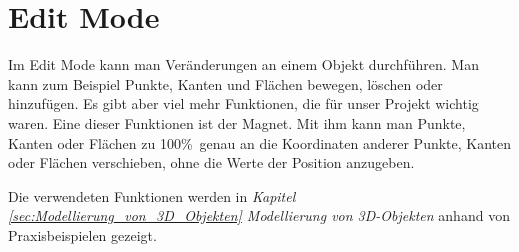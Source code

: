 \section{Edit Mode}
Im Edit Mode kann man Veränderungen an einem Objekt durchführen. Man kann zum Beispiel Punkte, Kanten und Flächen bewegen, löschen oder hinzufügen.
Es gibt aber viel mehr Funktionen, die für unser Projekt wichtig waren. Eine dieser Funktionen ist der Magnet. Mit ihm kann man Punkte, Kanten oder Flächen zu 100\%\ genau an
die Koordinaten anderer Punkte, Kanten oder Flächen verschieben, ohne die Werte der Position anzugeben.

Die verwendeten Funktionen werden in \textit{Kapitel \ref{sec:Modellierung_von_3D_Objekten} \dq Modellierung von 3D-Objekten\dq} anhand von
Praxisbeispielen gezeigt.
